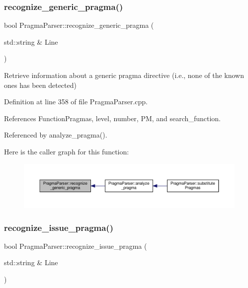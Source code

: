 \subsubsection{\texorpdfstring{recognize\+\_\+generic\+\_\+pragma()}{recognize\_generic\_pragma()}}
{\footnotesize\ttfamily bool Pragma\+Parser\+::recognize\+\_\+generic\+\_\+pragma (\begin{DoxyParamCaption}\item[{std\+::string \&}]{Line }\end{DoxyParamCaption})\hspace{0.3cm}{\ttfamily [private]}}



Retrieve information about a generic pragma directive (i.\+e., none of the known ones has been detected) 



Definition at line 358 of file Pragma\+Parser.\+cpp.



References Function\+Pragmas, level, number, PM, and search\+\_\+function.



Referenced by analyze\+\_\+pragma().

Here is the caller graph for this function\+:
\nopagebreak
\begin{figure}[H]
\begin{center}
\leavevmode
\includegraphics[width=350pt]{d6/d6c/classPragmaParser_ac119f35e2a4b60c2f332305025b64ad5_icgraph}
\end{center}
\end{figure}
\mbox{\label{classPragmaParser_a21060de0d17913f42fd0b4b7472b243c}} 
\subsubsection{\texorpdfstring{recognize\+\_\+issue\+\_\+pragma()}{recognize\_issue\_pragma()}}
{\footnotesize\ttfamily bool Pragma\+Parser\+::recognize\+\_\+issue\+\_\+pragma (\begin{DoxyParamCaption}\item[{std\+::string \&}]{Line }\end{DoxyParamCaption})\hspace{0.3cm}{\ttfamily [private]}}



